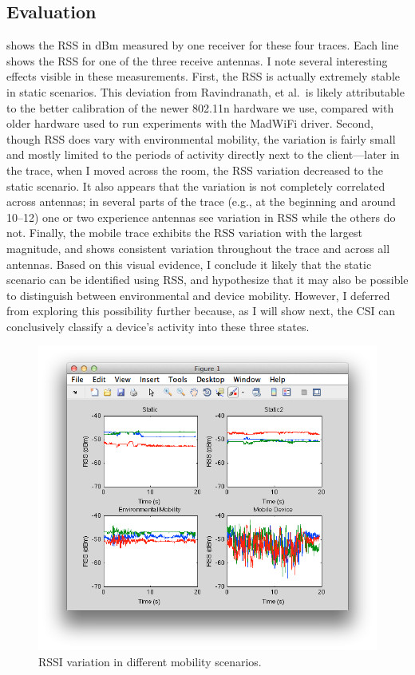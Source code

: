 \subsection{Evaluation}
  shows the RSS in dBm measured by one receiver for these four traces. Each line shows the RSS for one of the three receive antennas. I note several interesting effects visible in these measurements. First, the RSS is actually extremely stable in static scenarios. This deviation from Ravindranath, et al.\ is likely attributable to the better calibration of the newer 802.11n hardware we use, compared with older hardware used to run experiments with the MadWiFi driver. Second, though RSS does vary with environmental mobility, the variation is fairly small and mostly limited to the periods of activity directly next to the client---later in the trace, when I moved across the room, the RSS variation decreased to the static scenario. It also appears that the variation is not completely correlated across antennas; in several parts of the trace (e.g., at the beginning and around 10--12\s) one or two experience antennas see variation in RSS while the others do not. Finally, the mobile trace exhibits the RSS variation with the largest magnitude, and shows consistent variation throughout the trace and across all antennas. Based on this visual evidence, I conclude it likely that the static scenario can be identified using RSS, and hypothesize that it may also be possible to distinguish between environmental and device mobility. However, I deferred from exploring this possibility further because, as I will show next, the CSI can conclusively classify a device's activity into these three states.

\begin{figure}[htp]
	\centering
	\includegraphics[width=\textwidth]{figures/esnr/mobility_rssi.png}
	\caption{\label{fig:mobility_rssi}RSSI variation in different mobility scenarios.}
\end{figure}

